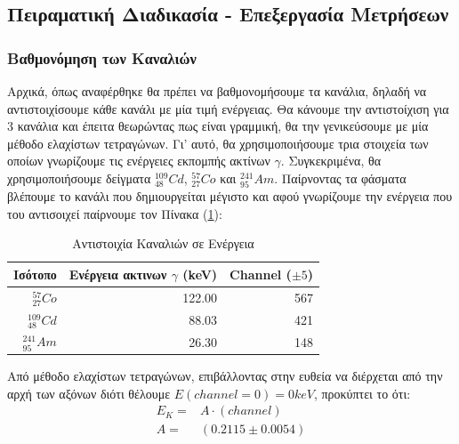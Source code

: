\documentclass[a4paper]{article}
\begin{document}
\subsection*{Πειραματική Διαδικασία - Επεξεργασία Μετρήσεων}
	\subsubsection*{Βαθμονόμηση των Καναλιών}
	
		Αρχικά, όπως αναφέρθηκε θα πρέπει να βαθμονομήσουμε τα κανάλια, δηλαδή να αντιστοιχίσουμε κάθε κανάλι με μία τιμή ενέργειας.  Θα κάνουμε την αντιστοίχιση για 3 κανάλια και έπειτα θεωρώντας πως είναι γραμμική, θα την γενικεύσουμε με μία μέθοδο ελαχίστων τετραγώνων.  Γι' αυτό, θα χρησιμοποιήσουμε τρια στοιχεία των οποίων γνωρίζουμε τις ενέργειες εκπομπής ακτίνων $\gamma$. Συγκεκριμένα, θα χρησιμοποιήσουμε δείγματα $^{109}_{48}Cd$, $^{57}_{27}Co$ και $^{241}_{95}Am$. Παίρνοντας τα φάσματα βλέπουμε το κανάλι που δημιουργείται μέγιστο και αφού γνωρίζουμε την ενέργεια που του αντισοιχεί παίρνουμε τον Πίνακα (\ref{mat1}):
		\begin{table}[h!]
			\centering
			\begin{tabular}{|r|r|r|}
				\hline Ισότοπο & Ενέργεια ακτινων $\gamma$ (keV) & Channel ($\pm5$)\vspace{0.1cm} \\\hline\hline\vspace{0.1cm}
				$^{57}_{27}Co$  & 122.00  & 567 \\\hline\vspace{0.1cm}
				$^{109}_{48}Cd$ & 88.03   & 421 \\ \hline\vspace{0.1cm}
				$^{241}_{95}Am$ & 26.30   & 148 \\\hline
			\end{tabular}
			\caption{ Αντιστοιχία Καναλιών σε Ενέργεια}
			\label{mat1}
		\end{table}
		
		Από μέθοδο ελαχίστων τετραγώνων, επιβάλλοντας στην ευθεία να διέρχεται από την αρχή των αξόνων διότι θέλουμε $E(channel=0)=0keV$, προκύπτει το ότι: 
			\begin{align*}
				E_K =& A\cdot (channel) \\ 
				A   =& (0.2115	\pm 0.0054 )
			\end{align*}
			
\end{document}
